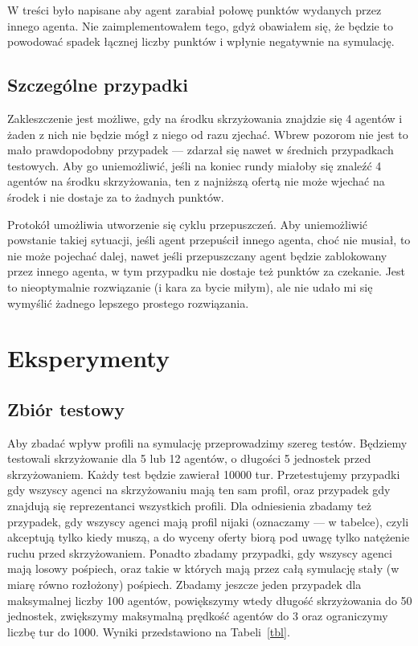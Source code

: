 \documentclass[11pt]{article}
\begin{document}
W treści było napisane aby agent zarabiał połowę punktów wydanych przez innego agenta. Nie zaimplementowałem tego, gdyż obawiałem się, że będzie to powodować spadek łącznej liczby punktów i wpłynie negatywnie na symulację.

\subsection{Szczególne przypadki}
Zakleszczenie jest możliwe, gdy na środku skrzyżowania znajdzie się 4 agentów i żaden z nich nie będzie mógł z niego od razu zjechać. Wbrew pozorom nie jest to mało prawdopodobny przypadek --- zdarzał się nawet w średnich przypadkach testowych. Aby go uniemożliwić, jeśli na koniec rundy miałoby się znaleźć 4 agentów na środku skrzyżowania, ten z najniższą ofertą nie może wjechać na środek i nie dostaje za to żadnych punktów.

Protokół umożliwia utworzenie się cyklu przepuszczeń. Aby uniemożliwić powstanie takiej sytuacji, jeśli agent przepuścił innego agenta, choć nie musiał, to nie może pojechać dalej, nawet jeśli przepuszczany agent będzie zablokowany przez innego agenta, w tym przypadku nie dostaje też punktów za czekanie. Jest to nieoptymalnie rozwiązanie (i kara za bycie miłym), ale nie udało mi się wymyślić żadnego lepszego prostego rozwiązania.


\section{Eksperymenty}
\subsection{Zbiór testowy}
Aby zbadać wpływ profili na symulację przeprowadzimy szereg testów. Będziemy testowali skrzyżowanie dla 5 lub 12 agentów, o długości 5 jednostek przed skrzyżowaniem. Każdy test będzie zawierał 10000 tur. Przetestujemy przypadki gdy wszyscy agenci na skrzyżowaniu mają ten sam profil, oraz przypadek gdy znajdują się reprezentanci wszystkich profili. Dla odniesienia zbadamy też przypadek, gdy wszyscy agenci mają profil nijaki (oznaczamy --- w tabelce), czyli akceptują tylko kiedy muszą, a do wyceny oferty biorą pod uwagę tylko natężenie ruchu przed skrzyżowaniem. Ponadto zbadamy przypadki, gdy wszyscy agenci mają losowy pośpiech, oraz takie w których mają przez całą symulację stały (w miarę równo rozłożony) pośpiech. Zbadamy jeszcze jeden przypadek dla maksymalnej liczby 100 agentów, powiększymy wtedy długość skrzyżowania do 50 jednostek, zwiększymy maksymalną prędkość agentów do 3 oraz ograniczymy liczbę tur do 1000. Wyniki przedstawiono na Tabeli~\ref{tbl}.
\end{document}
